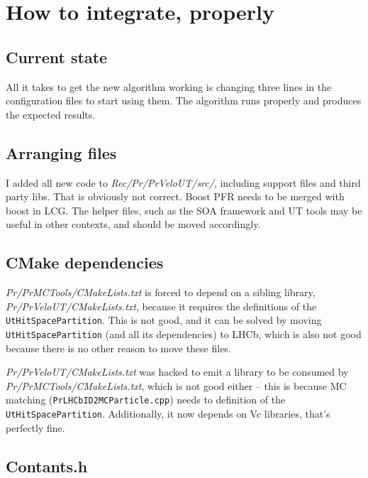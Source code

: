 \documentclass[12pt]{article}
\newcommand{\code}[1]{\texttt{#1}}
\begin{document}

\newpage
\section{How to integrate, properly}

\subsection{Current state}

All it takes to get the new algorithm working is changing three lines in the configuration files to start using them. The algorithm runs properly and produces the expected results.


\subsection{Arranging files}

I added all new code to \textit{Rec/Pr/PrVeloUT/src/}, including support files and third party libs. That is obviously not correct. Boost PFR needs to be merged with boost in LCG. The helper files, such as the SOA framework and UT tools may be useful in other contexts, and should be moved accordingly.

\subsection{CMake dependencies}

\textit{Pr/PrMCTools/CMakeLists.txt} is forced to depend on a sibling library, \textit{Pr/PrVeloUT/CMakeLists.txt}, because it requires the definitions of the \code{UtHitSpacePartition}. This is not good, and it can be solved by moving \code{UtHitSpacePartition} (and all its dependencies) to LHCb, which is also not good because there is no other reason to move these files.

\textit{Pr/PrVeloUT/CMakeLists.txt} was hacked to emit a library to be consumed by \textit{Pr/PrMCTools/CMakeLists.txt}, which is not good either -- this is because MC matching (\code{PrLHCbID2MCParticle.cpp}) needs to definition of the \code{UtHitSpacePartition}. Additionally, it now depends on Vc libraries, that's perfectly fine. 


\subsection{Contants.h}
\end{document}
